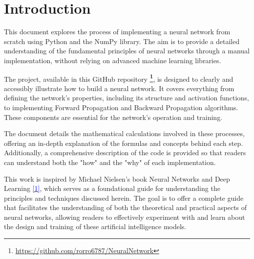 \documentclass[../main]{subfiles}
\begin{document}
\chapter{Introduction}

{
\hypersetup{linkcolor=black}
\minitoc
}

This document explores the process of implementing a neural network from scratch using Python and the NumPy library. The aim is to provide a detailed understanding of the fundamental principles of neural networks through a manual implementation, without relying on advanced machine learning libraries.

The project, available in this GitHub repository \textbf{\footnote{\url{https://github.com/rorro6787/NeuralNetwork}}}, is designed to clearly and accessibly illustrate how to build a neural network. It covers everything from defining the network's properties, including its structure and activation functions, to implementing Forward Propagation and Backward Propagation algorithms. These components are essential for the network's operation and training.

The document details the mathematical calculations involved in these processes, offering an in-depth explanation of the formulas and concepts behind each step. Additionally, a comprehensive description of the code is provided so that readers can understand both the "how" and the "why" of each implementation.

This work is inspired by Michael Nielsen's book Neural Networks and Deep Learning \hyperlink{target:zona}{\textcolor{blue}{[1]}}, which serves as a foundational guide for understanding the principles and techniques discussed herein. The goal is to offer a complete guide that facilitates the understanding of both the theoretical and practical aspects of neural networks, allowing readers to effectively experiment with and learn about the design and training of these artificial intelligence models.
\end{document}
